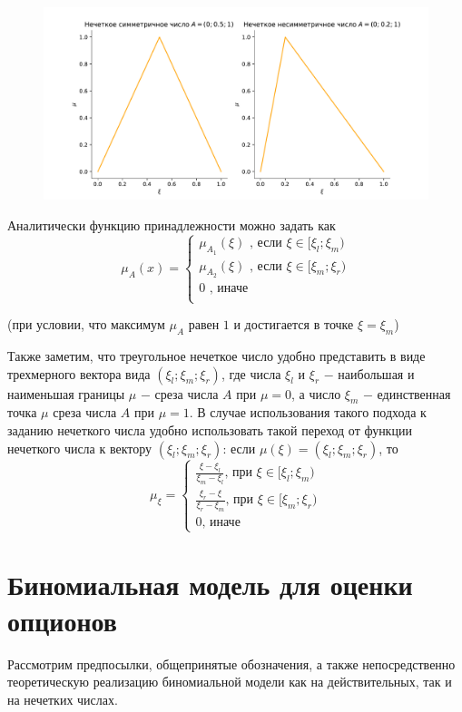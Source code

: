 \documentclass[a4paper,12pt]{extarticle} %
\begin{document}
	\begin{figure}[H]
		\centering
		\includegraphics[width=\textwidth]{_images/Биномиальная модель на нечетких числах_1.pdf}
	\end{figure}
	
	Аналитически функцию принадлежности можно задать как \[\mu_A(x)=\begin{cases} \mu_{A_1}(\xi) \text{ , если } \xi \in [\xi_l;\xi_m) \\ \mu_{A_2}(\xi) \text{ , если } \xi \in [\xi_m;\xi_r) \\ 0 \text{ , иначе} \\ \end{cases}\] 
	
	(при условии, что максимум $\mu_A$ равен $1$ и достигается в точке $\xi = \xi_m$)
	
	Также заметим, что треугольное нечеткое число удобно представить в виде трехмерного вектора вида $(\xi_l;\xi_m;\xi_r)$, где числа $\xi_l$ и $\xi_r$ $-$ наибольшая и наименьшая границы $\mu$ $-$ среза числа $A$ при $\mu=0$, а число $\xi_m$ $-$ единственная точка $\mu$ среза числа $A$ при $\mu=1$. В случае использования такого подхода к заданию нечеткого числа удобно использовать такой переход \cite{6} от функции нечеткого числа к вектору $(\xi_l;\xi_m;\xi_r)$: если $\mu(\xi)=(\xi_l;\xi_m;\xi_r)$, то \[\mu_{\xi}=\begin{cases} \frac{\xi-\xi_l}{\xi_m-\xi_l} \text{, при } \xi \in [\xi_l;\xi_m) \\ \frac{\xi_r-\xi}{\xi_r-\xi_m} \text{, при } \xi \in [\xi_m;\xi_r) \\ 0 \text{, иначе } \end{cases}\]
	
	\section{Биномиальная модель для оценки опционов}
	Рассмотрим предпосылки, общепринятые обозначения, а также непосредственно теоретическую реализацию биномиальной модели как на действительных, так и на нечетких числах. 
\end{document}
